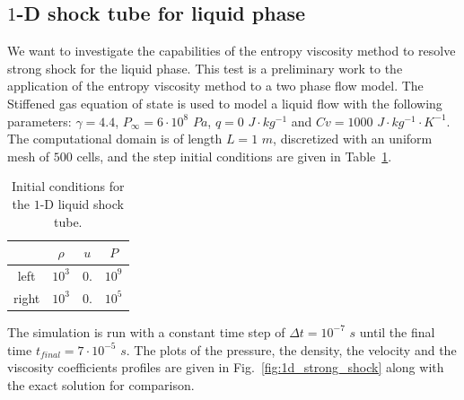 \documentclass[preprint,10pt]{elsarticle}
\newcommand{\fig}[1]{Fig.~\ref{#1}}                      %
\newcommand{\tbl}[1]{Table~\ref{#1}}                     %
\begin{document}
\subsection{$1$-D shock tube for liquid phase} \label{sec:liquid_shock}
We want to investigate the capabilities of the entropy viscosity method to resolve strong shock for the liquid phase. This test is a preliminary work to the application of the entropy viscosity method to a two phase flow model. The Stiffened gas equation of state is used to model a liquid flow with the following parameters: $\gamma = 4.4$, $P_{\infty} = 6 \cdot 10^8$ $Pa$, $q = 0$ $J \cdot kg^{-1}$ and $Cv = 1000$ $J \cdot kg^{-1} \cdot K^{-1}$. The computational domain is of length $L=1$ $m$, discretized with an uniform mesh of $500$ cells, and the step initial conditions are given in \tbl{tbl:ic_strong_shock}.
\begin{table}[H]
\begin{center}
 \caption{\label{tbl:ic_strong_shock} Initial conditions for the $1$-D liquid shock tube.}
 \begin{tabular}{|c|c|c|c|}
 \hline
   & $\rho$ & $u$ & $P$ \\
 \hline
left & $10^{3}$ & $0.$ & $10^9$ \\
  \hline
  right & $10^{3}$ & $0.$ & $10^5$ \\
  \hline
\end{tabular}
\end{center}
\end{table}
The simulation is run with a constant time step of $\Delta t = 10^{-7}$ $s$ until the final time $t_{final} = 7 \cdot 10^{-5}$ $s$. The plots of the pressure, the density, the velocity and the viscosity coefficients profiles are given in \fig{fig:1d_strong_shock} along with the exact solution for comparison.
\end{document}
